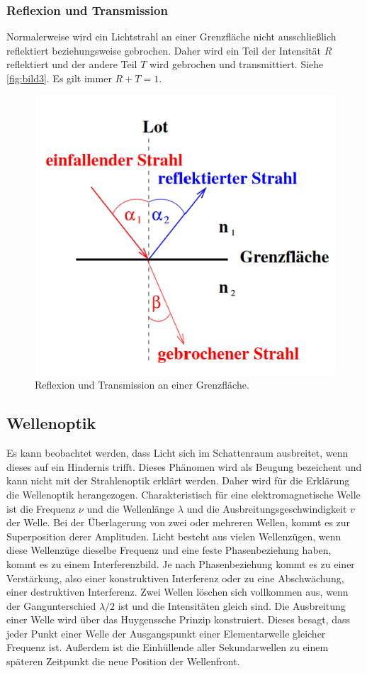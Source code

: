 \subsubsection{Reflexion und Transmission}
\label{sec:Reflexion und Transmission}
Normalerweise wird ein Lichtstrahl an einer Grenzfläche nicht ausschließlich reflektiert beziehungsweise gebrochen.
Daher wird ein Teil der Intensität $R$ reflektiert und der andere Teil $T$ wird gebrochen und transmittiert. Siehe \autoref{fig:bild3}. 
Es gilt immer $R + T = 1$.

\begin{figure}[H]
    \centering
	\includegraphics[width=0.6\linewidth]{content/grafik/trans.png}
	\caption{Reflexion und Transmission an einer Grenzfläche. \cite{reflex}}
	\label{fig:bild3}
\end{figure}

\subsection{Wellenoptik}
\label{sec:Wellenoptik}
Es kann beobachtet werden, dass Licht sich im Schattenraum ausbreitet, wenn dieses auf ein Hindernis trifft.
Dieses Phänomen wird als Beugung bezeichent und kann nicht mit der Strahlenoptik erklärt werden.  Daher wird 
für die Erklärung die Wellenoptik herangezogen. Charakteristisch für eine elektromagnetische Welle ist die Frequenz $\nu$
und die Wellenlänge $\lambda $ und die Ausbreitungsgeschwindigkeit $v$ der Welle. Bei der Überlagerung von zwei oder mehreren Wellen, 
kommt es zur Superposition derer Amplituden. Licht besteht aus vielen Wellenzügen, wenn diese Wellenzüge dieselbe Frequenz und eine
feste Phasenbeziehung haben, kommt es zu einem Interferenzbild. Je nach Phasenbeziehung kommt es zu einer Verstärkung, also 
einer konstruktiven Interferenz oder zu eine Abschwächung, einer destruktiven Interferenz. Zwei Wellen löschen sich vollkommen aus,
wenn der Gangunterschied $\lambda/2$ ist und die Intensitäten gleich sind. Die Ausbreitung einer Welle wird über das Huygenssche
Prinzip konstruiert. Dieses besagt, dass jeder Punkt einer Welle der Ausgangspunkt einer Elementarwelle gleicher Frequenz ist.
Außerdem ist die Einhüllende aller Sekundarwellen zu einem späteren Zeitpunkt die neue Position der Wellenfront.

